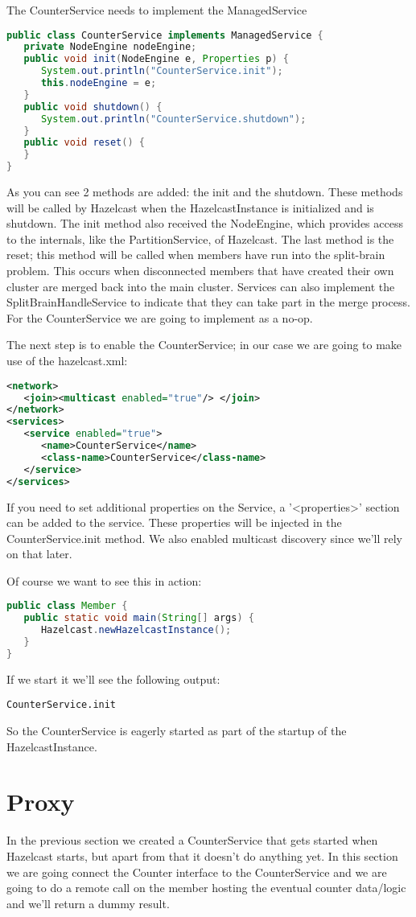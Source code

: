 The CounterService needs to implement the ManagedService
\begin{lstlisting}[language=java]
public class CounterService implements ManagedService {
   private NodeEngine nodeEngine;
   public void init(NodeEngine e, Properties p) {
      System.out.println("CounterService.init");
      this.nodeEngine = e;
   }
   public void shutdown() {
      System.out.println("CounterService.shutdown");
   }
   public void reset() {
   }
}
\end{lstlisting}
As you can see 2 methods are added: the init and the shutdown. These methods will be called by Hazelcast when the HazelcastInstance is initialized and is shutdown. The init method also received the NodeEngine, which provides access to the internals, like the PartitionService, of Hazelcast. The last method is the reset; this method will be called when members have run into the split-brain problem. This occurs when disconnected members that have created their own cluster are merged back into the main cluster. Services can also implement the SplitBrainHandleService to indicate that they can take part in the merge process. For the CounterService we are going to implement as a no-op.

The next step is to enable the CounterService; in our case we are going to make use of the hazelcast.xml:
\begin{lstlisting}[language=xml]
<network>
   <join><multicast enabled="true"/> </join>
</network>
<services>
   <service enabled="true">
      <name>CounterService</name>
      <class-name>CounterService</class-name>
   </service>
</services>
\end{lstlisting}
If you need to set additional properties on the Service, a '<properties>' section can be added to the service. These properties will be injected in the CounterService.init method. We also enabled multicast discovery since we'll rely on that later.

Of course we want to see this in action:
\begin{lstlisting}[language=java]
public class Member {
   public static void main(String[] args) {
      Hazelcast.newHazelcastInstance();
   }
}
\end{lstlisting}
If we start it we'll see the following output:
\begin{lstlisting}
CounterService.init
\end{lstlisting}
So the CounterService is eagerly started as part of the startup of the HazelcastInstance.

\section{Proxy}
In the previous section we created a CounterService that gets started when Hazelcast starts, but apart from that it doesn't do anything yet. In this section we are going connect the Counter interface to the CounterService and we are going to do a remote call on the member hosting the eventual counter data/logic and we'll return a dummy result.

